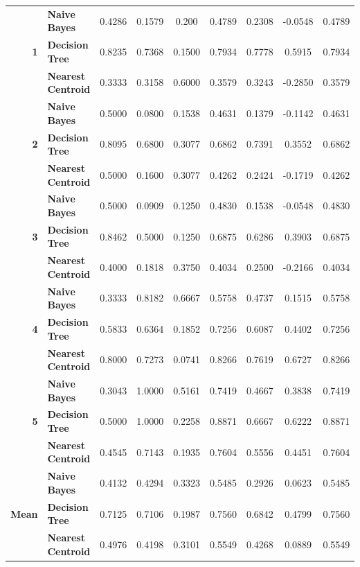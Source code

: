 \begin{center}
\begin{longtable}{ | r  l | c | c | c | c | c | c | c | }
\multirow{3}{*}{\textbf{1}} & \textbf{Naive Bayes} & 
0.4286 & 0.1579 & 0.200  & 0.4789 & 0.2308 & -0.0548 & 0.4789 \\
& \textbf{Decision Tree} & 
0.8235 & 0.7368 & 0.1500 & 0.7934 & 0.7778 &  0.5915 & 0.7934 \\
& \textbf{Nearest Centroid} &
0.3333 & 0.3158 & 0.6000 & 0.3579 & 0.3243 & -0.2850 & 0.3579 \\
\hline
\multirow{3}{*}{\textbf{2}} & \textbf{Naive Bayes} & 
0.5000 & 0.0800 & 0.1538 & 0.4631 & 0.1379 & -0.1142 & 0.4631 \\
& \textbf{Decision Tree} & 
0.8095 & 0.6800 & 0.3077 & 0.6862 & 0.7391 &  0.3552 & 0.6862 \\
& \textbf{Nearest Centroid} &
0.5000 & 0.1600 & 0.3077 & 0.4262 & 0.2424 & -0.1719 & 0.4262 \\
\hline
\multirow{3}{*}{\textbf{3}} & \textbf{Naive Bayes} & 
0.5000 & 0.0909 & 0.1250 & 0.4830 & 0.1538 & -0.0548 & 0.4830 \\
& \textbf{Decision Tree} & 
0.8462 & 0.5000 & 0.1250 & 0.6875 & 0.6286 &  0.3903 & 0.6875  \\
& \textbf{Nearest Centroid} &
0.4000 & 0.1818 & 0.3750 & 0.4034 & 0.2500 & -0.2166 & 0.4034 \\
\hline
\multirow{3}{*}{\textbf{4}} & \textbf{Naive Bayes} & 
0.3333 & 0.8182 & 0.6667 & 0.5758 & 0.4737 & 0.1515 & 0.5758 \\
& \textbf{Decision Tree} & 
0.5833 & 0.6364 & 0.1852 & 0.7256 & 0.6087 & 0.4402 & 0.7256 \\
& \textbf{Nearest Centroid} &
0.8000 & 0.7273 & 0.0741 & 0.8266 & 0.7619 & 0.6727 & 0.8266 \\
\hline
\multirow{3}{*}{\textbf{5}} & \textbf{Naive Bayes} & 
0.3043 & 1.0000 & 0.5161 & 0.7419 & 0.4667 & 0.3838 & 0.7419 \\
& \textbf{Decision Tree} & 
0.5000 & 1.0000 & 0.2258 & 0.8871 & 0.6667 & 0.6222 & 0.8871 \\
& \textbf{Nearest Centroid} &
0.4545 & 0.7143 & 0.1935 & 0.7604 & 0.5556 & 0.4451 & 0.7604 \\
\hline
\multirow{3}{*}{\textbf{Mean}} & \textbf{Naive Bayes} & 
0.4132 & 0.4294 & 0.3323 & 0.5485 & 0.2926 & 0.0623 & 0.5485 \\
& \textbf{Decision Tree} & 
0.7125 & 0.7106 & 0.1987 & 0.7560 & 0.6842 & 0.4799 & 0.7560 \\
& \textbf{Nearest Centroid} &
0.4976 & 0.4198 & 0.3101 & 0.5549 & 0.4268 & 0.0889 & 0.5549 \\
\hline
\end{longtable}
\end{center}

